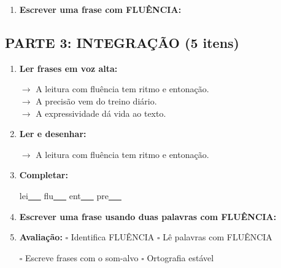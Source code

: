 \begin{exercicio}
\begin{enumerate}[resume]
  \item \textbf{Escrever uma frase com FLUÊNCIA:}
  \begin{center}
  \underline{\hspace{12cm}}
  \end{center}

\end{enumerate}

\subsection*{PARTE 3: INTEGRAÇÃO (5 itens)}

\begin{enumerate}[resume]

  \item \textbf{Ler frases em voz alta:}
  \begin{center}
  $\rightarrow$ A leitura com fluência tem ritmo e entonação.\\
  $\rightarrow$ A precisão vem do treino diário.\\
  $\rightarrow$ A expressividade dá vida ao texto.\\
  \end{center}

  \item \textbf{Ler e desenhar:}
  \begin{center}
  $\rightarrow$ A leitura com fluência tem ritmo e entonação.
  \end{center}
  \begin{center}
  \end{center}

  \item \textbf{Completar:}
  \begin{center}
  lei\underline{~~~} \quad flu\underline{~~~} \quad ent\underline{~~~} \quad pre\underline{~~~}
  \end{center}

  \item \textbf{Escrever uma frase usando duas palavras com FLUÊNCIA:}
  \begin{center}
  \underline{\hspace{12cm}}
  \end{center}

  \item \textbf{Avaliação:} $\square$ Identifica FLUÊNCIA \quad $\square$ Lê palavras com FLUÊNCIA
  \begin{center}
  $\square$ Escreve frases com o som-alvo \quad $\square$ Ortografia estável
  \end{center}


\end{enumerate}
\end{exercicio}
